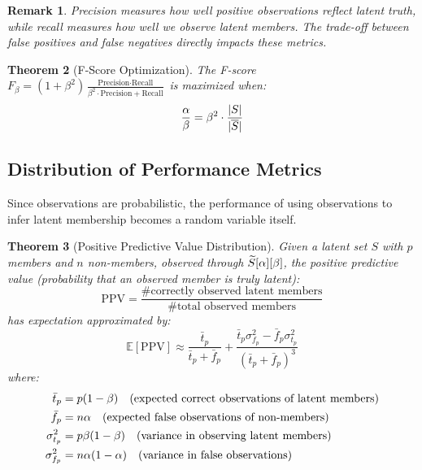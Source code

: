 \documentclass[11pt,final,hidelinks]{article}
\newtheorem{theorem}{Theorem}[section]
\newtheorem{remark}[theorem]{Remark}
\begin{document}
\begin{remark}
Precision measures how well positive observations reflect latent truth, while recall measures how well we observe latent members. The trade-off between false positives and false negatives directly impacts these metrics.
\end{remark}

\begin{theorem}[F-Score Optimization]
The F-score $F_\beta = (1+\beta^2) \frac{\text{Precision} \cdot \text{Recall}}{\beta^2 \cdot \text{Precision} + \text{Recall}}$ is maximized when:
\begin{equation}
\frac{\alpha}{\beta} = \beta^2 \cdot \frac{\lvert S\rvert}{\lvert\overline{S}\rvert}
\end{equation}
\end{theorem}

\subsection{Distribution of Performance Metrics}

Since observations are probabilistic, the performance of using observations to infer latent membership becomes a random variable itself.

\begin{theorem}[Positive Predictive Value Distribution]
Given a latent set $S$ with $p$ members and $n$ non-members, observed through $\widetilde{S}[\alpha][\beta]$, the positive predictive value (probability that an observed member is truly latent):
\begin{equation}
\text{PPV} = \frac{\text{\# correctly observed latent members}}{\text{\# total observed members}}
\end{equation}
has expectation approximated by:
\begin{equation}
\mathbb{E}[\text{PPV}] \approx \frac{\bar{t}_p}{\bar{t}_p + \bar{f}_p} + \frac{\bar{t}_p \sigma_{f_p}^2 - \bar{f}_p \sigma_{t_p}^2}{(\bar{t}_p + \bar{f}_p)^3}
\end{equation}
where:
\begin{align}
\bar{t}_p &= p(1-\beta) \quad \text{(expected correct observations of latent members)} \\
\bar{f}_p &= n\alpha \quad \text{(expected false observations of non-members)} \\
\sigma_{t_p}^2 &= p\beta(1-\beta) \quad \text{(variance in observing latent members)} \\
\sigma_{f_p}^2 &= n\alpha(1-\alpha) \quad \text{(variance in false observations)}
\end{align}
\end{theorem}
\end{document}

